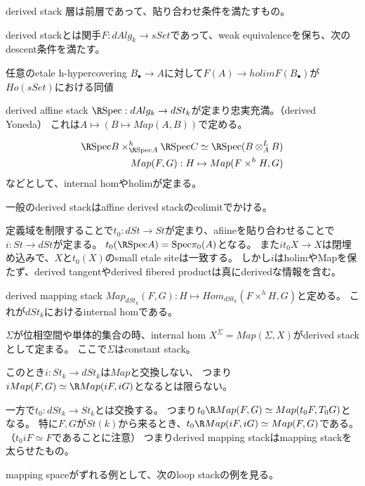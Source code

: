 \documentclass[dvipdfmx]{beamer}
\newcommand{\spec}{\mathrm{Spec}}
\begin{document}
\begin{frame}[fragile]{derived stack}
層は前層であって、貼り合わせ条件を満たすもの。

\begin{dfn}
derived stackとは関手$F:dAlg_k \to sSet$であって、weak equivalenceを保ち、次のdescent条件を満たす。

任意のetale h-hypercovering $B_\bullet \to A$に対して$F(A) \to holim F(B_\bullet)$が$Ho(sSet)$における同値

\end{dfn}
\end{frame}

\begin{frame}{derived affine stack}
$\R \spec:dAlg_k \to dSt_k$が定まり忠実充満。（derived Yoneda）
これは$A \mapsto (B \mapsto Map(A,B))$で定める。

\begin{align*}
\R \spec B \times^h_{\R \spec A}\R \spec C \simeq \R \spec(B \otimes^L_AB)\\
Map(F,G):H\mapsto Map(F\times^hH,G)
\end{align*}
などとして、internal homやholimが定まる。

一般のderived stackはaffine derived stackのcolimitでかける。

定義域を制限することで$t_0:dSt \to St$が定まり、afiineを貼り合わせることで$i:St \to dSt$が定まる。
$t_0(\R \spec A)=\spec \pi_0(A)$となる。
また$it_0X \to X$は閉埋め込みで、$X$と$t_0(X)$のsmall etale siteは一致する。
しかし$i$はholimやMapを保たず、derived tangentやderived fibered productは真にderivedな情報を含む。
\end{frame}

\begin{frame}{derived mapping stack}
$Map_{dSt_k}(F,G):H \mapsto Hom_{dSt_k}(F\times^hH, G)$と定める。
これが$dSt_k$におけるinternal homである。

$\Sigma$が位相空間や単体的集合の時、internal hom $X^\Sigma=Map(\Sigma,X)$がderived stackとして定まる。
ここで$\Sigma$はconstant stack。

このとき$i:St_k \to dSt_k$は$Map$と交換しない、
つまり$iMap(F,G)\simeq \R Map(iF, iG)$となるとは限らない。

一方で$t_0:dSt_k \to St_k$とは交換する。
つまり$t_0\R Map(F,G) \simeq Map(t_0F, T_0G)$となる。
特に$F, G$が$St(k)$から来るとき、$t_0\R Map(iF, iG)\simeq Map(F,G)$である。（$t_0iF\simeq F$であることに注意）
つまりderived mapping stackはmapping stackを太らせたもの。

mapping spaceがずれる例として、次のloop stackの例を見る。
\end{frame}
\end{document}
